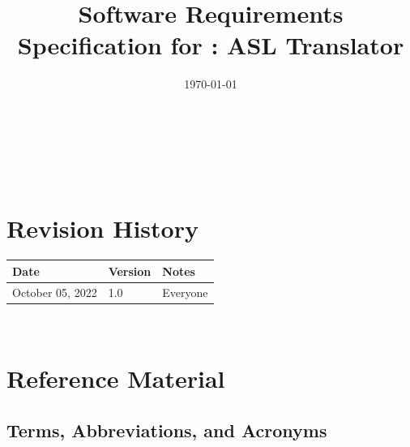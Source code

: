 \documentclass[12pt]{article}
\begin{document}
\title{Software Requirements Specification for \progname: ASL Translator} 
\author{\authname}
\date{\today}

\maketitle

~\newpage


\tableofcontents

~\newpage

\section*{Revision History}

\begin{tabularx}{\textwidth}{p{4cm}p{2cm}X}
\toprule {\bf Date  } & {\bf Version} & {\bf Notes}\\
\midrule
October 05, 2022 & 1.0 & Everyone\\

\bottomrule
\end{tabularx}

~\newpage

\section{Reference Material}

\subsection{Terms, Abbreviations, and Acronyms}
\end{document}
